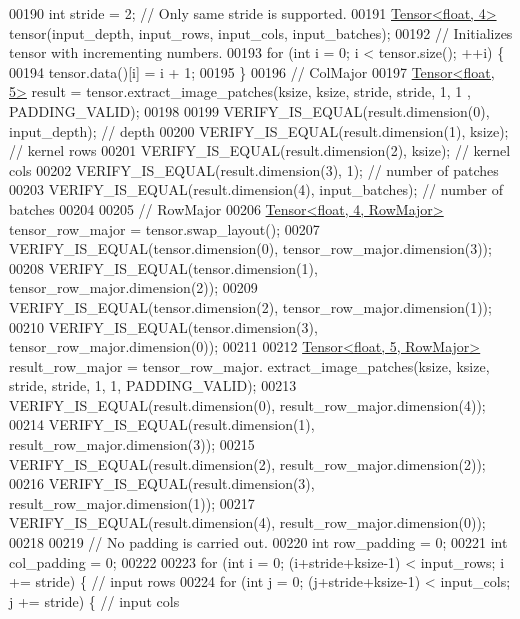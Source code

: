 \begin{DoxyCode}
00190   \textcolor{keywordtype}{int} stride = 2;  \textcolor{comment}{// Only same stride is supported.}
00191   \hyperlink{class_eigen_1_1_tensor}{Tensor<float, 4>} tensor(input\_depth, input\_rows, input\_cols, input\_batches);
00192   \textcolor{comment}{// Initializes tensor with incrementing numbers.}
00193   \textcolor{keywordflow}{for} (\textcolor{keywordtype}{int} i = 0; i < tensor.size(); ++i) \{
00194     tensor.data()[i] = i + 1;
00195   \}
00196   \textcolor{comment}{// ColMajor}
00197   \hyperlink{class_eigen_1_1_tensor}{Tensor<float, 5>} result = tensor.extract\_image\_patches(ksize, ksize, stride, stride, 1, 1
      , PADDING\_VALID);
00198 
00199   VERIFY\_IS\_EQUAL(result.dimension(0), input\_depth);  \textcolor{comment}{// depth}
00200   VERIFY\_IS\_EQUAL(result.dimension(1), ksize);  \textcolor{comment}{// kernel rows}
00201   VERIFY\_IS\_EQUAL(result.dimension(2), ksize);  \textcolor{comment}{// kernel cols}
00202   VERIFY\_IS\_EQUAL(result.dimension(3), 1);  \textcolor{comment}{// number of patches}
00203   VERIFY\_IS\_EQUAL(result.dimension(4), input\_batches);  \textcolor{comment}{// number of batches}
00204 
00205   \textcolor{comment}{// RowMajor}
00206   \hyperlink{class_eigen_1_1_tensor}{Tensor<float, 4, RowMajor>} tensor\_row\_major = tensor.swap\_layout();
00207   VERIFY\_IS\_EQUAL(tensor.dimension(0), tensor\_row\_major.dimension(3));
00208   VERIFY\_IS\_EQUAL(tensor.dimension(1), tensor\_row\_major.dimension(2));
00209   VERIFY\_IS\_EQUAL(tensor.dimension(2), tensor\_row\_major.dimension(1));
00210   VERIFY\_IS\_EQUAL(tensor.dimension(3), tensor\_row\_major.dimension(0));
00211 
00212   \hyperlink{class_eigen_1_1_tensor}{Tensor<float, 5, RowMajor>} result\_row\_major = tensor\_row\_major.
      extract\_image\_patches(ksize, ksize, stride, stride, 1, 1, PADDING\_VALID);
00213   VERIFY\_IS\_EQUAL(result.dimension(0), result\_row\_major.dimension(4));
00214   VERIFY\_IS\_EQUAL(result.dimension(1), result\_row\_major.dimension(3));
00215   VERIFY\_IS\_EQUAL(result.dimension(2), result\_row\_major.dimension(2));
00216   VERIFY\_IS\_EQUAL(result.dimension(3), result\_row\_major.dimension(1));
00217   VERIFY\_IS\_EQUAL(result.dimension(4), result\_row\_major.dimension(0));
00218 
00219   \textcolor{comment}{// No padding is carried out.}
00220   \textcolor{keywordtype}{int} row\_padding = 0;
00221   \textcolor{keywordtype}{int} col\_padding = 0;
00222 
00223   \textcolor{keywordflow}{for} (\textcolor{keywordtype}{int} i = 0; (i+stride+ksize-1) < input\_rows; i += stride) \{  \textcolor{comment}{// input rows}
00224     \textcolor{keywordflow}{for} (\textcolor{keywordtype}{int} j = 0; (j+stride+ksize-1) < input\_cols; j += stride) \{  \textcolor{comment}{// input cols}

\end{DoxyCode}

